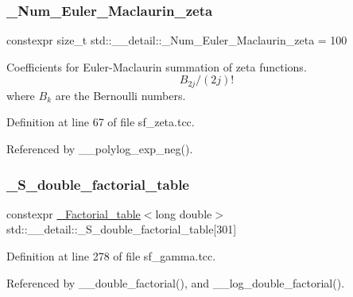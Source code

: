 \subsubsection{\texorpdfstring{\+\_\+\+Num\+\_\+\+Euler\+\_\+\+Maclaurin\+\_\+zeta}{\_Num\_Euler\_Maclaurin\_zeta}}
{\footnotesize\ttfamily constexpr size\+\_\+t std\+::\+\_\+\+\_\+detail\+::\+\_\+\+Num\+\_\+\+Euler\+\_\+\+Maclaurin\+\_\+zeta = 100}

Coefficients for Euler-\/\+Maclaurin summation of zeta functions. \[ B_{2j} / (2j)! \] where $ B_k $ are the Bernoulli numbers. 

Definition at line 67 of file sf\+\_\+zeta.\+tcc.



Referenced by \+\_\+\+\_\+polylog\+\_\+exp\+\_\+neg().

\mbox{\label{namespacestd_1_1____detail_a6d1131fefdb30b2746c76ff801bdc833}} 
\subsubsection{\texorpdfstring{\+\_\+\+S\+\_\+double\+\_\+factorial\+\_\+table}{\_S\_double\_factorial\_table}}
{\footnotesize\ttfamily constexpr \hyperlink{structstd_1_1____detail_1_1__Factorial__table}{\+\_\+\+Factorial\+\_\+table}$<$long double$>$ std\+::\+\_\+\+\_\+detail\+::\+\_\+\+S\+\_\+double\+\_\+factorial\+\_\+table\mbox{[}301\mbox{]}}



Definition at line 278 of file sf\+\_\+gamma.\+tcc.



Referenced by \+\_\+\+\_\+double\+\_\+factorial(), and \+\_\+\+\_\+log\+\_\+double\+\_\+factorial().

\mbox{\label{namespacestd_1_1____detail_acd941b49595dd03e93c88107ad2f68c2}} 
